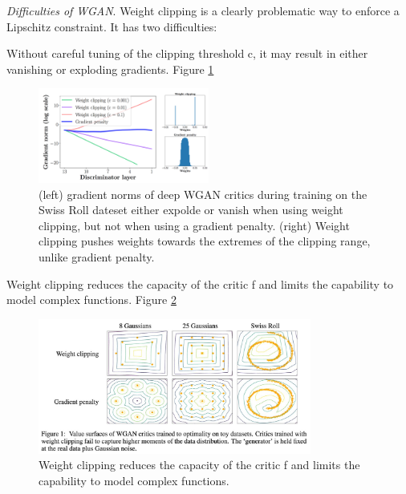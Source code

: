 \documentclass[english]{article}
\begin{document}
\benum
\item {\emph{Difficulties of WGAN}}.
 Weight clipping is a clearly problematic way to enforce a Lipschitz constraint. It has two difficulties:
 ~\\
\item  Without careful tuning of the clipping threshold c, it may result in either vanishing or exploding gradients. Figure \ref{explode}







 \begin{figure}[h!]
  \centering
  \includegraphics[width=0.5\textwidth]{explode.png}
  \caption{(left) gradient norms of deep WGAN critics during training on the Swiss Roll dateset either expolde or vanish when using weight clipping, but not when using a gradient penalty. (right) Weight clipping pushes weights towards the extremes of the clipping range, unlike gradient penalty.}
  \label{explode}
  \end{figure}




\item Weight clipping reduces the capacity of the critic f and limits the capability to model complex functions. Figure \ref{value} 
\begin{figure}[h!]
  \centering
  \includegraphics[width=0.8\textwidth]{value.jpg}
    \caption{Weight clipping reduces the capacity of the critic f and limits the capability to model complex functions.}
  \label{value}
 \end{figure}
\end{document}

